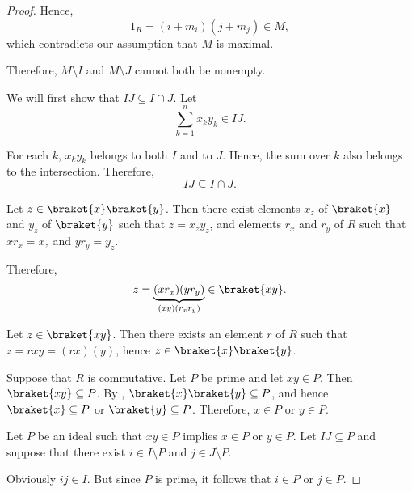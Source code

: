\begin{proof}
  Hence,
  \begin{equation*}
    1_R = (i + m_i) (j + m_j) \in M,
  \end{equation*}
  which contradicts our assumption that \( M \) is maximal.

  Therefore, \( M \setminus I \) and \( M \setminus J \) cannot both be nonempty.

   We will first show that \( IJ \subseteq I \cap J \). Let
  \begin{equation*}
    \sum_{k=1}^n x_k y_k \in IJ.
  \end{equation*}

  For each \( k \), \( x_k y_k \) belongs to both \( I \) and to \( J \). Hence, the sum over \( k \) also belongs to the intersection. Therefore,
  \begin{equation*}
    IJ \subseteq I \cap J.
  \end{equation*}

  \SufficiencySubProof* Let \( z \in \braket{x} \braket{y} \). Then there exist elements \( x_z \) of \( \braket{x} \) and \( y_z \) of \( \braket{y} \) such that \( z = x_z y_z \), and elements \( r_x \) and \( r_y \) of \( R \) such that \( x r_x = x_z \) and \( y r_y = y_z \).

  Therefore,
  \begin{equation*}
    z = \underbrace{(x r_x) (y r_y)}_{(xy) (r_x r_y)} \in \braket{xy}.
  \end{equation*}

  \NecessitySubProof* Let \( z \in \braket{xy} \). Then there exists an element \( r \) of \( R \) such that \( z = rxy = (rx)(y) \), hence \( z \in \braket{x} \braket{y} \).

   Suppose that \( R \) is commutative.
  \SufficiencySubProof* Let \( P \) be prime and let \( xy \in P \). Then \( \braket{xy} \subseteq P \). By , \( \braket{x} \braket{y} \subseteq P \), and hence \( \braket{x} \subseteq P \) or \( \braket{y} \subseteq P \). Therefore, \( x \in P \) or \( y \in P \).

  \NecessitySubProof* Let \( P \) be an ideal such that \( xy \in P \) implies \( x \in P \) or \( y \in P \). Let \( IJ \subseteq P \) and suppose that there exist \( i \in I \setminus P \) and \( j \in J \setminus P \).

  Obviously \( ij \in I \). But since \( P \) is prime, it follows that \( i \in P \) or \( j \in P \).


\end{proof}
